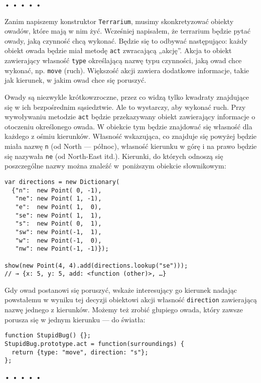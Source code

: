 \begin{center}
• • • • •
\end{center}

  
Zanim napiszemy konstruktor \texttt{Terrarium}, musimy skonkretyzować obiekty owadów, które mają w nim żyć. Wcześniej napisałem, że terrarium będzie pytać owady, jaką czynność chcą wykonać. Będzie się to odbywać następująco: każdy obiekt owada będzie miał metodę \texttt{act} zwracającą „akcję”. Akcja to obiekt zawierający własność \texttt{type} określającą nazwę typu czynności, jaką owad chce wykonać, np. \texttt{move} (ruch). Większość akcji zawiera dodatkowe informacje, takie jak kierunek, w jakim owad chce się poruszyć.

  
Owady są niezwykle krótkowzroczne, przez co widzą tylko kwadraty znajdujące się w ich bezpośrednim sąsiedztwie. Ale to wystarczy, aby wykonać ruch. Przy wywoływaniu metodzie \texttt{act} będzie przekazywany obiekt zawierający informacje o otoczeniu określonego owada. W obiekcie tym będzie znajdować się własność dla każdego z ośmiu kierunków. Własność wskazująca, co znajduje się powyżej będzie miała nazwę \texttt{n} (od North — północ), własność kierunku w górę i na prawo będzie się nazywała \texttt{ne} (od North-East itd.). Kierunki, do których odnoszą się poszczególne nazwy można znaleźć w~poniższym obiekcie słownikowym:

  
\begin{verbatim} 
var directions = new Dictionary(
  {"n":  new Point( 0, -1),
   "ne": new Point( 1, -1),
   "e":  new Point( 1,  0),
   "se": new Point( 1,  1),
   "s":  new Point( 0,  1),
   "sw": new Point(-1,  1),
   "w":  new Point(-1,  0),
   "nw": new Point(-1, -1)});

show(new Point(4, 4).add(directions.lookup("se")));
// → {x: 5, y: 5, add: <function (other)>, …}
\end{verbatim}
  
Gdy owad postanowi się poruszyć, wskaże interesujący go kierunek nadając powstałemu w wyniku tej decyzji obiektowi akcji własność \texttt{direction} zawierającą nazwę jednego z kierunków. Możemy też zrobić głupiego owada, który zawsze porusza się w jednym kierunku — do światła:

  
\begin{verbatim} 
function StupidBug() {};
StupidBug.prototype.act = function(surroundings) {
  return {type: "move", direction: "s"};
};
 \end{verbatim}


\begin{center}
• • • • •
\end{center}

